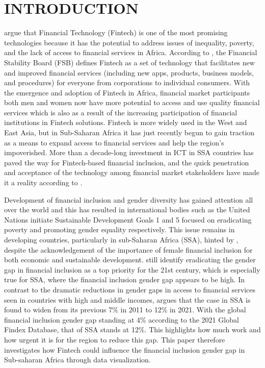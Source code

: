 \documentclass[preprint, 3p,
authoryear]{elsarticle} %
\begin{document}
\hypertarget{introduction}{%
\section{INTRODUCTION}\label{introduction}}

\citet{banna2022fintech} argue that Financial Technology (Fintech) is
one of the most promising technologies because it has the potential to
address issues of inequality, poverty, and the lack of access to
financial services in Africa. According to \citet{board2020financial},
the Financial Stability Board (FSB) defines Fintech as a set of
technology that facilitates new and improved financial services
(including new apps, products, business models, and procedures) for
everyone from corporations to individual consumers. With the emergence
and adoption of Fintech in Africa, financial market participants both
men and women now have more potential to access and use quality
financial services which is also as a result of the increasing
participation of financial institutions in Fintech solutions. Fintech is
more widely used in the West and East Asia, but in Sub-Saharan Africa it
has just recently begun to gain traction as a means to expand access to
financial services and help the region's impoverished. More than a
decade-long investment in ICT in SSA countries has paved the way for
Fintech-based financial inclusion, and the quick penetration and
acceptance of the technology among financial market stakeholders have
made it a reality according to \citet{tchamyou2019role}.

\bigskip

Development of financial inclusion and gender diversity has gained
attention all over the world and this has resulted in international
bodies such as the United Nations initiate Sustainable Development Goals
1 and 5 focused on eradicating poverty and promoting gender equality
respectively. This issue remains in developing countries, particularly
in sub-Saharan Africa (SSA), hinted by \citet{demirguc2018global},
despite the acknowledgement of the importance of female financial
inclusion for both economic and sustainable development.
\citet{adegbite2020bridging} still identify eradicating the gender gap
in financial inclusion as a top priority for the 21st century, which is
especially true for SSA, where the financial inclusion gender gap
appears to be high. In contrast to the dramatic reductions in gender
gaps in access to financial services seen in countries with high and
middle incomes, \citet{Ferrer2023Sub-Saharan} argues that the case in
SSA is found to widen from its previous 7\% in 2011 to 12\% in 2021.
With the global financial inclusion gender gap standing at 4\% according
to the 2021 Global Findex Database, that of SSA stands at 12\%. This
highlights how much work and how urgent it is for the region to reduce
this gap. This paper therefore investigates how Fintech could influence
the financial inclusion gender gap in Sub-saharan Africa through data
visualization.
\end{document}
